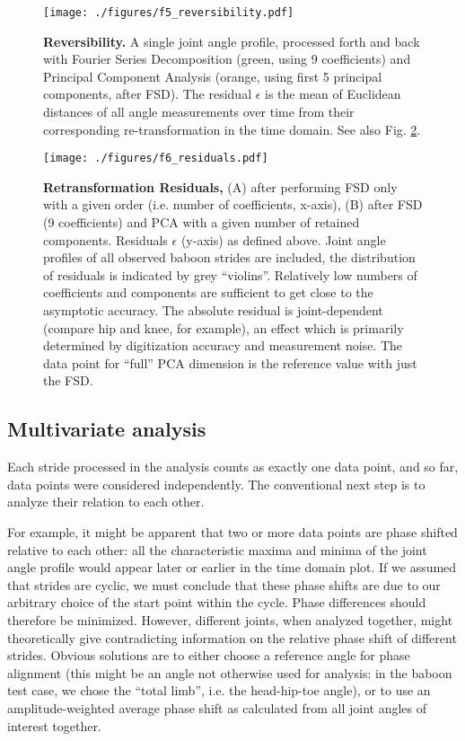 \documentclass[10pt,a4paper]{article}
\begin{document}
\begin{figure}[pt]
\centering
\texttt{[image: ./figures/f5\_reversibility.pdf]}
\caption{\label{fig:reversibility}\textbf{Reversibility.} A single joint angle profile, processed forth and back with Fourier Series Decomposition (green, using 9 coefficients) and Principal Component Analysis (orange, using first 5 principal components, after FSD). The residual \(\epsilon\) is the mean of Euclidean distances of all angle measurements over time from their corresponding re-transformation in the time domain. See also Fig. \ref{fig:residuals}.}
\end{figure}

\begin{figure}[pt]
\centering
\texttt{[image: ./figures/f6\_residuals.pdf]}
\caption{\label{fig:residuals}\textbf{Retransformation Residuals,} (A) after performing FSD only with a given order (i.e. number of coefficients, x-axis), (B) after FSD (9 coefficients) and PCA with a given number of retained components. Residuals \(\epsilon\) (y-axis) as defined above. Joint angle profiles of all observed baboon strides are included, the distribution of residuals is indicated by grey ``violins''. Relatively low numbers of coefficients and components are sufficient to get close to the asymptotic accuracy. The absolute residual is joint-dependent (compare hip and knee, for example), an effect which is primarily determined by digitization accuracy and measurement noise. The data point for ``full'' PCA dimension is the reference value with just the FSD.}
\end{figure}

\subsection{Multivariate analysis}
\label{sec:org0943845}
Each stride processed in the analysis counts as exactly one data point, and so far, data points were considered independently.
The conventional next step is to analyze their relation to each other.

For example, it might be apparent that two or more data points are phase shifted relative to each other: all the characteristic maxima and minima of the joint angle profile would appear later or earlier in the time domain plot.
If we assumed that strides are cyclic, we must conclude that these phase shifts are due to our arbitrary choice of the start point within the cycle.
Phase differences should therefore be minimized.
However, different joints, when analyzed together, might theoretically give contradicting information on the relative phase shift of different strides.
Obvious solutions are to either choose a reference angle for phase alignment (this might be an angle not otherwise used for analysis: in the baboon test case, we chose the ``total limb'', i.e. the head-hip-toe angle), or to use an amplitude-weighted average phase shift as calculated from all joint angles of interest together.
\end{document}
